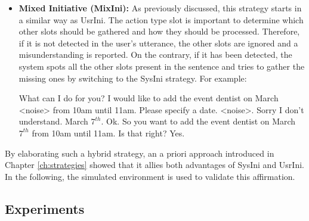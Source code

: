\begin{itemize}
          \item \textbf{Mixed Initiative (MixIni):} As previously discussed, this strategy starts in a similar way as UsrIni. The action type slot is important to determine which other slots should be gathered and how they should be processed. Therefore, if it is not detected in the user's utterance, the other slots are ignored and a misunderstanding is reported. On the contrary, if it has been detected, the system spots all the other slots present in the sentence and tries to gather the missing ones by switching to the SysIni strategy. For example:
					
              \begin{dialogue}
                   What can I do for you?
                   I would like to add the event dentist on March <noise> from 10am until 11am.
                   Please specify a date.
                   <noise>.
                   Sorry I don't understand.
                   March $7^{th}$.
                   Ok. So you want to add the event dentist on March $7^{th}$ from 10am until 11am. Is that right?
                   Yes.
              \end{dialogue}
     	\end{itemize}

              By elaborating such a hybrid strategy, an a priori approach introduced in Chapter \ref{ch:strategies} showed that it allies both advantages of SysIni and UsrIni. In the following, the simulated environment is used to validate this affirmation.
              
    \subsection{Experiments}
    

